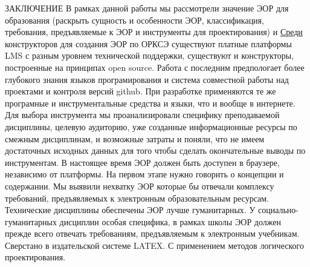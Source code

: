 ЗАКЛЮЧЕНИЕ
В рамках данной работы мы рассмотрели значение ЭОР для образования (раскрыть сущность и особенности ЭОР, классификация, требования, предъявляемые к ЭОР и инструменты для проектирования) и \hyperref[goal]{Среди} конструкторов для создания ЭОР по ОРКСЭ существуют платные платформы LMS с разным уровнем технической поддержки, существуют и конструкторы, построенные на принципах open source. Работа с последним предпологает более глубокого знания языков програмирования и система совместной работы над проектами и контроля версий github. При разработке применяются те же програмные и инструментальные средства и языки, что и вообще в интернете. Для выбора инструмента мы проанализировали специфику преподаваемой дисциплины, целевую аудиторию, уже созданные информационные ресурсы по смежным дисциплинам, и возможные затраты и поняли, что не имеем достаточных исходных данных для того чтобы сделать окончательные выводы по инструментам. В настоящее время ЭОР должен быть доступен в браузере, независимо от платформы.
На первом этапе нужно говорить о концепции и содержании. Мы выявили нехватку ЭОР которые бы отвечали комплексу требований, предъявляемых к электронным образовательным ресурсам. Технические дисциплины обеспечены ЭОР лучше гуманитарных. У социально-гуманитарных дисциплин особая специфика, в рамках школы ЭОР должен прежде всего отвечать требованиям, предъявляемым к электронным учебникам.
Сверстано в издательской системе LATEX. С применением методов логического проектирования.

\listoftodos